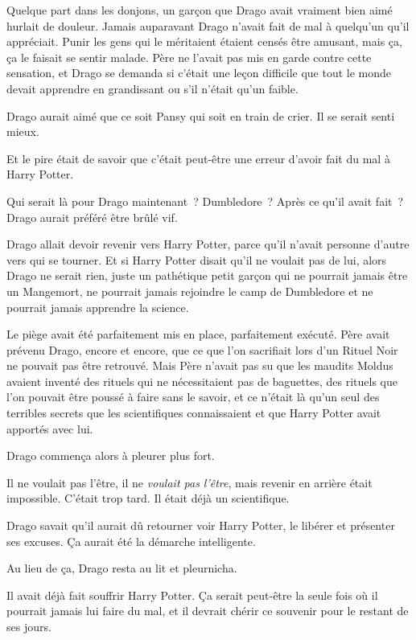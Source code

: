 Quelque part dans les donjons, un garçon que Drago avait vraiment bien aimé hurlait de douleur.
Jamais auparavant Drago n'avait fait de mal à quelqu'un qu'il appréciait.
Punir les gens qui le méritaient étaient censés être amusant, mais ça, ça le faisait se sentir malade.
Père ne l'avait pas mis en garde contre cette sensation, et Drago se demanda si c'était une leçon difficile que tout le monde devait apprendre en grandissant ou s'il n'était qu'un faible.

Drago aurait aimé que ce soit Pansy qui soit en train de crier.
Il se serait senti mieux.

Et le pire était de savoir que c'était peut-être une erreur d'avoir fait du mal à Harry Potter.

Qui serait là pour Drago maintenant~?
Dumbledore~?
Après ce qu'il avait fait~?
Drago aurait préféré être brûlé vif.

Drago allait devoir revenir vers Harry Potter, parce qu'il n'avait personne d'autre vers qui se tourner.
Et si Harry Potter disait qu'il ne voulait pas de lui, alors Drago ne serait rien, juste un pathétique petit garçon qui ne pourrait jamais être un Mangemort, ne pourrait jamais rejoindre le camp de Dumbledore et ne pourrait jamais apprendre la science.

Le piège avait été parfaitement mis en place, parfaitement exécuté.
Père avait prévenu Drago, encore et encore, que ce que l'on sacrifiait lors d'un Rituel Noir ne pouvait pas être retrouvé.
Mais Père n'avait pas su que les maudits Moldus avaient inventé des rituels qui ne nécessitaient pas de baguettes, des rituels que l'on pouvait être poussé à faire sans le savoir, et ce n'était là qu'un seul des terribles secrets que les scientifiques connaissaient et que Harry Potter avait apportés avec lui.

Drago commença alors à pleurer plus fort.

Il ne voulait pas l'être, il ne \emph{voulait pas l'être}, mais revenir en arrière était impossible.
C'était trop tard.
Il était déjà un scientifique.

Drago savait qu'il aurait dû retourner voir Harry Potter, le libérer et présenter ses excuses.
Ça aurait été la démarche intelligente.

Au lieu de ça, Drago resta au lit et pleurnicha.

Il avait déjà fait souffrir Harry Potter.
Ça serait peut-être la seule fois où il pourrait jamais lui faire du mal, et il devrait chérir ce souvenir pour le restant de ses jours.

